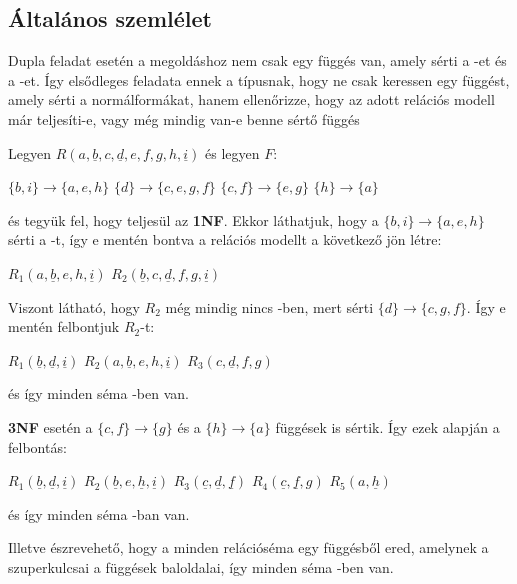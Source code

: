 \subsection{Általános szemlélet}
Dupla feladat esetén a megoldáshoz nem csak egy függés van, amely sérti a \nfk-et és a \nfh-et. Így elsődleges feladata ennek a típusnak, hogy ne csak keressen egy függést, amely sérti a normálformákat, hanem ellenőrizze, hogy az adott relációs modell már teljesíti-e, vagy még mindig van-e benne sértő függés
\begin{pld}
    Legyen $R(a,\underline{b},c,\underline{d},e,f,g,h,\underline{i})$ és legyen $F$:
    \begin{center}
        $\{b,i\} \longrightarrow \{a,e,h\}$ \break
        $\{d\} \longrightarrow \{c,e,g,f\}$ \break
        $\{c,f\} \longrightarrow \{e,g\}$ \break
        $\{h\} \longrightarrow \{a\}$ \break
    \end{center}
    és tegyük fel, hogy teljesül az \textbf{1NF}. Ekkor láthatjuk, hogy a  $\{b,i\} \longrightarrow \{a,e,h\}$ sérti a \nfk-t, így e mentén bontva a relációs modellt a következő jön létre:
    \begin{center}
        $R_1(a,\underline{b},e,h,\underline{i})$ \break
        $R_2(\underline{b},c,\underline{d},f,g,\underline{i})$
    \end{center}
    Viszont látható, hogy $R_2$ még mindig nincs \nfk-ben, mert sérti $\{d\} \longrightarrow \{c,g,f\}$. Így e mentén felbontjuk $R_2$-t:
    \begin{center}
        $R_1(\underline{b},\underline{d},\underline{i})$\break
        $R_2(a,\underline{b},e,h,\underline{i})$ \break
        $R_3(c,\underline{d},f,g)$\break
    \end{center}
    és így minden séma \nfk-ben van.\par
    \textbf{3NF} esetén a $\{c,f\} \longrightarrow \{g\}$ és a $\{h\} \longrightarrow \{a\}$ függések is sértik. Így ezek alapján a felbontás:
    \begin{center}
        $R_1(\underline{b},\underline{d},\underline{i})$\break
        $R_2(\underline{b},e,\underline{h},\underline{i})$ \break
        $R_3(\underline{c},\underline{d},\underline{f})$\break
        $R_4(\underline{c},\underline{f},g)$\break
        $R_5(a,\underline{h})$\break
    \end{center}
    és így minden séma \nfh-ban van.\par
    Illetve észrevehető, hogy a minden relációséma egy függésből ered, amelynek a szuperkulcsai a függések baloldalai, így minden séma \BCNF-ben van.
\end{pld}


